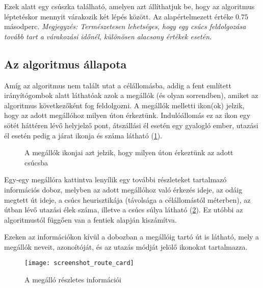 Ezek alatt egy csúszka található, amelyen azt állíthatjuk be, hogy az algoritmus léptetéskor mennyit várakozik két lépés között. Az alapértelmezett értéke $0.75$ másodperc.
\textit{Megjegyzés: Természetesen lehetséges, hogy egy csúcs feldolgozása tovább tart a várakozási időnél, különösen alacsony értékek esetén.}

\subsection{Az algoritmus állapota}

Amíg az algoritmus nem talált utat a célállomásba, addig a fent említett irányítógombok alatt láthatóak azok a megállók (és olyan sorrendben), amiket az algoritmus következőként fog feldolgozni. A megállók melletti ikon(ok) jelzik, hogy az adott megállóhoz milyen úton érkeztünk. Indulóállomás ez az ikon egy sötét háttéren lévő helyjelző pont, átszállási él esetén egy gyalogló ember, utazási él esetén pedig a járat ikonja és száma látható (\ref{fig:screenshot-icons}).

\begin{figure}[H]
	\centering
	\hspace{5pt}
	\hspace{5pt}
	\caption{A megállók ikonjai azt jelzik, hogy milyen úton érkeztünk az adott csúcsba}
	\label{fig:screenshot-icons}
\end{figure}

Egy-egy megállóra kattintva lenyílik egy további részleteket tartalmazó információs doboz, melyben az adott megállóhoz való érkezés ideje, az odáig megtett út ideje, a csúcs heurisztikája (távolsága a célállomástól méterben), az útban lévő utazási élek száma, illetve a csúcs súlya látható (\ref{fig:screenshot-route-card}). Ez utóbbi az algoritmustól függően van a fentiek alapján kiszámítva.

Ezeken az információkon kívül a dobozban a megállóig tartó út is látható, mely a megállók neveit, azonoítóját, és az utazás módját jelölő ikonokat tartalmazza.

\begin{figure}[H]
	\centering
	\texttt{[image: screenshot\_route\_card]}
	\caption{A megálló részletes információi}
	\label{fig:screenshot-route-card}
\end{figure}

